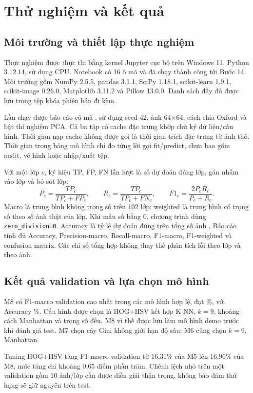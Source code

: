 \section{Thử nghiệm và kết quả}
\subsection{Môi trường và thiết lập thực nghiệm}
Thực nghiệm được thực thi bằng kernel Jupyter cục bộ trên Windows 11, Python 3.12.14, sử dụng CPU. Notebook có 16 ô mã và đã chạy thành công tới Bước 14. Môi trường gồm NumPy 2.5.5, pandas 3.1.1, SciPy 1.18.1, scikit-learn 1.9.1, scikit-image 0.26.0, Matplotlib 3.11.2 và Pillow 13.0.0. Danh sách đầy đủ được lưu trong tệp khóa phiên bản đi kèm.

Lần chạy được báo cáo có mã \texttt{\RunID}, sử dụng seed 42, ảnh 64\(\times\)64, cách chia Oxford và bật thí nghiệm PCA. Cả ba tập có cache đặc trưng khớp chữ ký dữ liệu/cấu hình. Thời gian nạp cache không được gọi là thời gian trích đặc trưng từ ảnh thô. Thời gian trong bảng mô hình chỉ đo từng lời gọi fit/predict, chưa bao gồm audit, vẽ hình hoặc nhập/xuất tệp.

Với một lớp \(c\), ký hiệu TP, FP, FN lần lượt là số dự đoán đúng lớp, gán nhầm vào lớp và bỏ sót lớp:
\[
P_c=\frac{TP_c}{TP_c+FP_c},\qquad
R_c=\frac{TP_c}{TP_c+FN_c},\qquad
F1_c=\frac{2P_cR_c}{P_c+R_c}.
\]
Macro là trung bình không trọng số trên 102 lớp; weighted là trung bình có trọng số theo số ảnh thật của lớp. Khi mẫu số bằng 0, chương trình dùng \texttt{zero\_division=0}. Accuracy là tỷ lệ dự đoán đúng trên tổng số ảnh \cite{metrics}. Báo cáo tính đủ Accuracy, Precision-macro, Recall-macro, F1-macro, F1-weighted và confusion matrix. Các chỉ số tổng hợp không thay thế phân tích lỗi theo lớp và theo ảnh.

\subsection{Kết quả validation và lựa chọn mô hình}

M8 có F1-macro validation cao nhất trong các mô hình hợp lệ, đạt \ValFOne\%, với Accuracy \ValAccuracy\%. Cấu hình được chọn là HOG+HSV kết hợp K-NN, \(k=9\), khoảng cách Manhattan và trọng số đều. M8 vì thế được lưu làm mô hình demo trước khi đánh giá test. M7 chọn cây Gini không giới hạn độ sâu; M6 cũng chọn \(k=9\), Manhattan.

Tuning HOG+HSV tăng F1-macro validation từ 16,31\% của M5 lên 16,96\% của M8, mức tăng chỉ khoảng 0,65 điểm phần trăm. Chênh lệch nhỏ trên một validation gồm 10 ảnh/lớp cần được diễn giải thận trọng, không bảo đảm thứ hạng sẽ giữ nguyên trên test.

